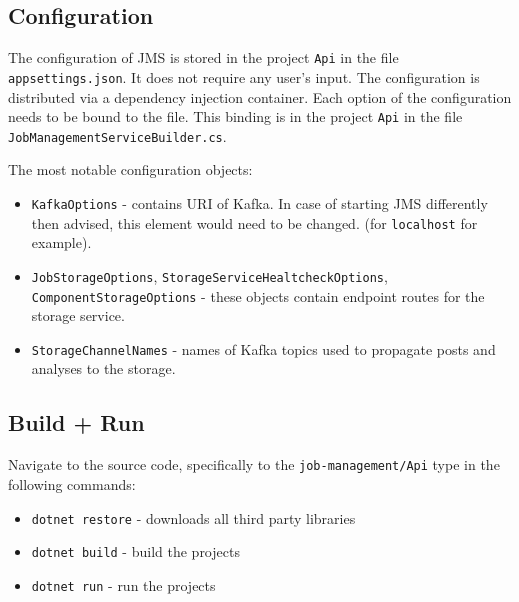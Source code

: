 \subsection{Configuration}

The configuration of JMS is stored in the project \texttt{Api} in the file \texttt{appsettings.json}. It does not require any user's input. The configuration is distributed via a dependency injection container. Each option of the configuration needs to be bound to the file. This binding is in the project \texttt{Api} in the file  \texttt{JobManagementServiceBuilder.cs}.

The most notable configuration objects:

\begin{itemize}
    \item \texttt{KafkaOptions} - contains URI of Kafka. In case of starting JMS differently then advised, this element would need to be changed. (for \texttt{localhost} for example).
    \item \texttt{JobStorageOptions}, \texttt{StorageServiceHealtcheckOptions}, \texttt{Component\-StorageOptions} - these objects contain endpoint routes for the storage service. 
    \item \texttt{StorageChannelNames} - names of Kafka topics used to propagate posts and analyses to the storage.
\end{itemize}

\subsection{Build + Run}

Navigate to the source code, specifically to the \texttt{job-management/Api} type in the following commands:

\begin{itemize}
    \item \texttt{dotnet restore} - downloads all third party libraries
    \item \texttt{dotnet build} - build the projects
    \item \texttt{dotnet run} - run the projects
\end{itemize}

